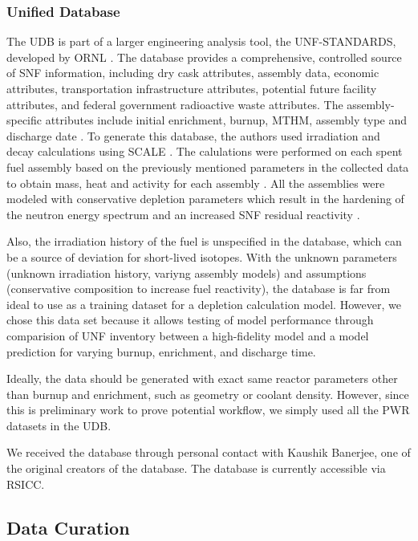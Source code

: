 \subsubsection{Unified Database}
The \gls{UDB} is part of a larger engineering
analysis tool, the \gls{UNF-STANDARDS}, developed
by \gls{ORNL} \cite{peterson_used_2013}.  
The database provides a comprehensive, controlled
source of \gls{SNF} information, including
dry cask attributes, assembly data, economic attributes,
transportation infrastructure attributes, potential future
facility attributes, and federal government radioactive
waste attributes. 
The assembly-specific attributes include
initial enrichment, burnup, \gls{MTHM}, assembly 
type and discharge date \cite{peterson_fuel_2015}. 
To generate this database, the authors used
irradiation and decay calculations using SCALE 
\cite{bowman_scale_2011}. The calulations were performed on each 
spent fuel assembly based on the previously mentioned 
parameters in the collected data to obtain mass, heat 
and activity for each assembly \cite{peterson_additional_2017}. 
All the assemblies were modeled with conservative 
depletion parameters which result in the hardening of 
the neutron energy spectrum and an increased \gls{SNF} 
residual reactivity \cite{peterson_additional_2017}. 

Also, the irradiation history of the fuel is unspecified in the
database, which can be a source of deviation for short-lived isotopes.
With the unknown parameters (unknown irradiation history, variyng
assembly models) and assumptions (conservative composition to
increase fuel reactivity), the database is far from ideal to use
as a training dataset for a depletion calculation model. However,
we chose this data set because it allows testing of model performance
through comparision of \gls{UNF}
inventory between a high-fidelity model and a model prediction for
varying burnup, enrichment, and discharge time.

Ideally, the data should be generated with exact same reactor
parameters other than burnup and enrichment, such as geometry or
coolant density. However, since
this is preliminary work to prove potential workflow, we
simply used all the \gls{PWR} datasets in the \gls{UDB}.

We received the database through personal contact with
Kaushik Banerjee, one of the original creators of the database.
The database is currently accessible via \gls{RSICC}.

\subsection{Data Curation}

